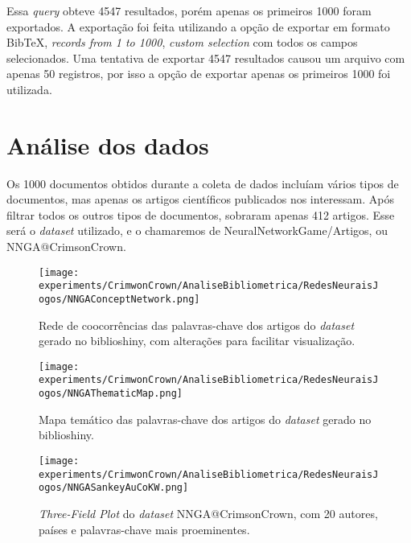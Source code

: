 Essa \textit{query} obteve 4547 resultados, porém apenas os primeiros 1000 foram exportados. A exportação foi feita utilizando a opção de exportar em formato BibTeX, \textit{records from 1 to 1000}, \textit{custom selection} com todos os campos selecionados. Uma tentativa de exportar 4547 resultados causou um arquivo com apenas 50 registros, por isso a opção de exportar apenas os primeiros 1000 foi utilizada.

\section{Análise dos dados}
Os 1000 documentos obtidos durante a coleta de dados incluíam vários tipos de documentos, mas apenas os artigos científicos publicados nos interessam. Após filtrar todos os outros tipos de documentos, sobraram apenas 412 artigos. Esse será o \textit{dataset} utilizado, e o chamaremos de NeuralNetworkGame/Artigos, ou NNGA@CrimsonCrown.

\begin{figure}
    \centering
    \texttt{[image: experiments/CrimwonCrown/AnaliseBibliometrica/RedesNeuraisJogos/NNGAConceptNetwork.png]}
    \caption{Rede de coocorrências das palavras-chave dos artigos do \textit{dataset} gerado no biblioshiny, com alterações para facilitar visualização.}
    \label{fig:CrimsonCrown:NNGA:CoOcurrence}
\end{figure}

\begin{figure}
    \centering
    \texttt{[image: experiments/CrimwonCrown/AnaliseBibliometrica/RedesNeuraisJogos/NNGAThematicMap.png]}
    \caption{Mapa temático das palavras-chave dos artigos do \textit{dataset} gerado no biblioshiny.}
    \label{fig:CrimsonCrown:NNGA:ThematicMap}
\end{figure}

\begin{figure}
    \centering
    \texttt{[image: experiments/CrimwonCrown/AnaliseBibliometrica/RedesNeuraisJogos/NNGASankeyAuCoKW.png]}
    \caption{\textit{Three-Field Plot} do \textit{dataset} NNGA@CrimsonCrown, com 20 autores, países e palavras-chave mais proeminentes.}
    \label{fig:CrimsonCrown:NNGA:CoOcurrence}
\end{figure}